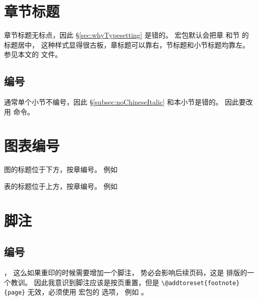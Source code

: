 \begin{Code}
\newcommand\beginnum{\begin{enumerate}
[itemsep=2pt plus 2pt minus 2pt,%
topsep=3pt plus 2pt minus 2pt,%
parsep=0pt plus 2pt minus 2pt]}
\newcommand\myendnum{\end{enumerate}}
\end{Code}

\section{章节标题}
章节标题无标点，因此 \S \ref{sec:whyTypesetting} 是错的。
 宏包默认会把章 和节 的标题居中，
这种样式显得很古板，章标题可以靠右，节标题和小节标题均靠左。
参见本文的 文件。

\subsection{编号}
通常单个小节不编号，因此 \S \ref{subsec:noChineseItalic} 和本小节是错的。
因此要改用 命令。

\section{图表编号} %

图的标题位于下方，按章编号。
例如

\begin{center}

\end{center}


表的标题位于上方，按章编号。
例如

\begin{center}

\end{center}


\section{脚注} %

\subsection{编号}
，
这么如果重印的时候需要增加一个脚注，
势必会影响后续页码，这是 \mybooktitle 排版的一个教训。
因此我意识到脚注应该是按页重置，但是 \verb|\@addtoreset{footnote}{page}|
无效，必须使用  宏包的  选项，
例如 。

